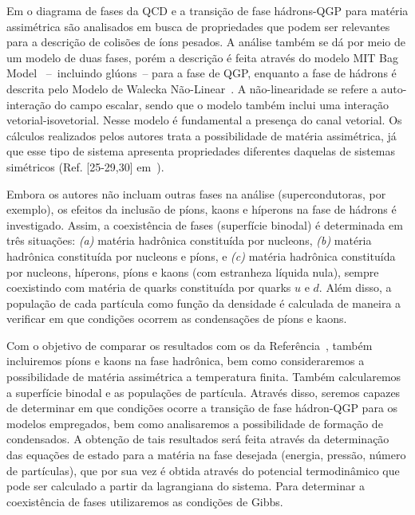 Em \textcite{Rafael} o diagrama de fases da QCD e a transição de fase hádrons-QGP para matéria assimétrica são analisados em busca de propriedades que podem ser relevantes para a descrição de colisões de íons pesados. A análise também se dá por meio de um modelo de duas fases, porém a descrição é feita através do modelo MIT Bag Model~\parencite{Buballa} --~incluindo glúons~-- para a fase de QGP, enquanto a fase de hádrons é descrita pelo Modelo de Walecka Não-Linear~\parencite{Advances16}. A não-linearidade se refere a auto-interação do campo escalar, sendo que o modelo também inclui uma interação vetorial-isovetorial. Nesse modelo é fundamental a presença do canal vetorial. Os cálculos realizados pelos autores trata a possibilidade de matéria assimétrica, já que esse tipo de sistema apresenta propriedades diferentes daquelas de sistemas simétricos (Ref. [25-29,30] em~\parencite{Rafael}).

Embora os autores não incluam outras fases na análise (supercondutoras, por exemplo), os efeitos da inclusão de píons, kaons e híperons na fase de hádrons é investigado. Assim, a coexistência de fases (superfície binodal) é determinada em três situações: \emph{(a)} matéria hadrônica constituída por nucleons, \emph{(b)} matéria hadrônica constituída por nucleons e píons, e \emph{(c)} matéria hadrônica constituída por nucleons, híperons, píons e kaons (com estranheza líquida nula), sempre coexistindo com matéria de quarks constituída por quarks $u$ e $d$. Além disso, a população de cada partícula como função da densidade é calculada de maneira a verificar em que condições ocorrem as condensações de píons e kaons.

Com o objetivo de comparar os resultados com os da Referência~\parencite{Rafael}, também incluiremos píons e kaons na fase hadrônica, bem como consideraremos a possibilidade de matéria assimétrica a temperatura finita. Também calcularemos a superfície binodal e as populações de partícula. Através disso, seremos capazes de determinar em que condições ocorre a transição de fase hádron-QGP para os modelos empregados, bem como analisaremos a possibilidade de formação de condensados. A obtenção de tais resultados será feita através da determinação das equações de estado para a matéria na fase desejada (energia, pressão, número de partículas), que por sua vez é obtida através do potencial termodinâmico que pode ser calculado a partir da lagrangiana do sistema. Para determinar a coexistência de fases utilizaremos as condições de Gibbs.

\vspace{1cm}

